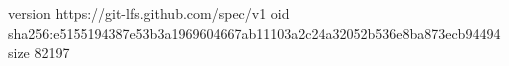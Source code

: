 version https://git-lfs.github.com/spec/v1
oid sha256:e5155194387e53b3a1969604667ab11103a2c24a32052b536e8ba873ecb94494
size 82197
